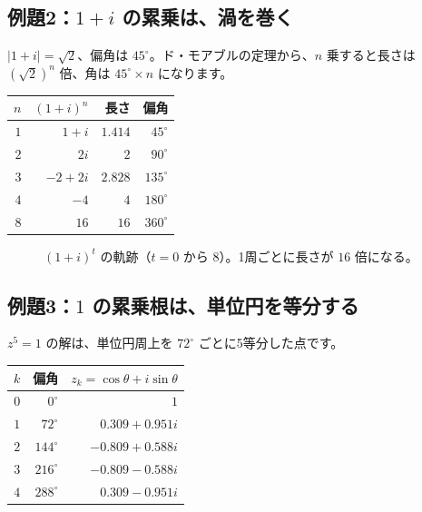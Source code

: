 \documentclass[a4paper,11pt,openany]{ltjsbook}
\begin{document}
\subsection*{例題2：$1+i$ の累乗は、渦を巻く}

$|1+i|=\sqrt2$、偏角は $45^\circ$。ド・モアブルの定理から、$n$ 乗すると長さは $(\sqrt2)^n$ 倍、角は $45^\circ\times n$ になります。

\begin{center}
\begin{tabular}{rrrr}
\toprule
$n$ & $(1+i)^n$ & 長さ & 偏角\\
\midrule
$1$ & $1+i$ & $1.414$ & $45^\circ$\\
$2$ & $2i$ & $2$ & $90^\circ$\\
$3$ & $-2+2i$ & $2.828$ & $135^\circ$\\
$4$ & $-4$ & $4$ & $180^\circ$\\
$8$ & $16$ & $16$ & $360^\circ$\\
\bottomrule
\end{tabular}
\end{center}

\begin{figure}[htbp]
\centering
{}
\caption{$(1+i)^t$ の軌跡（$t=0$ から $8$）。1周ごとに長さが $16$ 倍になる。}
\end{figure}

\subsection*{例題3：$1$ の累乗根は、単位円を等分する}

$z^5=1$ の解は、単位円周上を $72^\circ$ ごとに5等分した点です。

\begin{center}
\begin{tabular}{rrr}
\toprule
$k$ & 偏角 & $z_k=\cos\theta+i\sin\theta$\\
\midrule
$0$ & $0^\circ$ & $1$\\
$1$ & $72^\circ$ & $0.309+0.951i$\\
$2$ & $144^\circ$ & $-0.809+0.588i$\\
$3$ & $216^\circ$ & $-0.809-0.588i$\\
$4$ & $288^\circ$ & $0.309-0.951i$\\
\bottomrule
\end{tabular}
\end{center}
\end{document}
